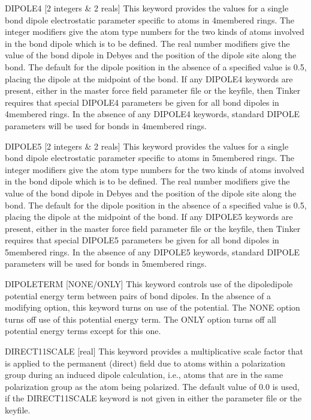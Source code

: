 \documentclass[letterpaper,11pt,english]{sphinxmanual}
\begin{document}
DIPOLE4 {[}2 integers \& 2 reals{]}     This keyword provides the values for a single bond dipole electrostatic parameter specific to atoms in 4\sphinxhyphen{}membered rings. The integer modifiers give the atom type numbers for the two kinds of atoms involved in the bond dipole which is to be defined. The real number modifiers give the value of the bond dipole in Debyes and the position of the dipole site along the bond. The default for the dipole position in the absence of a specified value is 0.5, placing the dipole at the midpoint of the bond. If any DIPOLE4 keywords are present, either in the master force field parameter file or the keyfile, then Tinker requires that special DIPOLE4 parameters be given for all bond dipoles in 4\sphinxhyphen{}membered rings. In the absence of any DIPOLE4 keywords, standard DIPOLE parameters will be used for bonds in 4\sphinxhyphen{}membered rings.

DIPOLE5 {[}2 integers \& 2 reals{]}     This keyword provides the values for a single bond dipole electrostatic parameter specific to atoms in 5\sphinxhyphen{}membered rings. The integer modifiers give the atom type numbers for the two kinds of atoms involved in the bond dipole which is to be defined. The real number modifiers give the value of the bond dipole in Debyes and the position of the dipole site along the bond. The default for the dipole position in the absence of a specified value is 0.5, placing the dipole at the midpoint of the bond. If any DIPOLE5 keywords are present, either in the master force field parameter file or the keyfile, then Tinker requires that special DIPOLE5 parameters be given for all bond dipoles in 5\sphinxhyphen{}membered rings. In the absence of any DIPOLE5 keywords, standard DIPOLE parameters will be used for bonds in 5\sphinxhyphen{}membered rings.

DIPOLETERM {[}NONE/ONLY{]}     This keyword controls use of the dipole\sphinxhyphen{}dipole potential energy term between pairs of bond dipoles. In the absence of a modifying option, this keyword turns on use of the potential. The NONE option turns off use of this potential energy term. The ONLY option turns off all potential energy terms except for this one.

DIRECT\sphinxhyphen{}11\sphinxhyphen{}SCALE {[}real{]}     This keyword provides a multiplicative scale factor that is applied to the permanent (direct) field due to atoms within a polarization group during an induced dipole calculation, i.e., atoms that are in the same polarization group as the atom being polarized. The default value of 0.0 is used, if the DIRECT\sphinxhyphen{}11\sphinxhyphen{}SCALE keyword is not given in either the parameter file or the keyfile.
\end{document}
